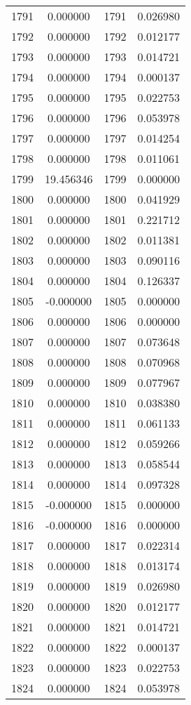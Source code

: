 \documentclass[12pt]{article}
\begin{document}
\begin{longtable}{@{}cccc@{}}
1791 & 0.000000 & 1791 & 0.026980 \\
1792 & 0.000000 & 1792 & 0.012177 \\
1793 & 0.000000 & 1793 & 0.014721 \\
1794 & 0.000000 & 1794 & 0.000137 \\
1795 & 0.000000 & 1795 & 0.022753 \\
1796 & 0.000000 & 1796 & 0.053978 \\
1797 & 0.000000 & 1797 & 0.014254 \\
1798 & 0.000000 & 1798 & 0.011061 \\
1799 & 19.456346 & 1799 & 0.000000 \\
1800 & 0.000000 & 1800 & 0.041929 \\
1801 & 0.000000 & 1801 & 0.221712 \\
1802 & 0.000000 & 1802 & 0.011381 \\
1803 & 0.000000 & 1803 & 0.090116 \\
1804 & 0.000000 & 1804 & 0.126337 \\
1805 & -0.000000 & 1805 & 0.000000 \\
1806 & 0.000000 & 1806 & 0.000000 \\
1807 & 0.000000 & 1807 & 0.073648 \\
1808 & 0.000000 & 1808 & 0.070968 \\
1809 & 0.000000 & 1809 & 0.077967 \\
1810 & 0.000000 & 1810 & 0.038380 \\
1811 & 0.000000 & 1811 & 0.061133 \\
1812 & 0.000000 & 1812 & 0.059266 \\
1813 & 0.000000 & 1813 & 0.058544 \\
1814 & 0.000000 & 1814 & 0.097328 \\
1815 & -0.000000 & 1815 & 0.000000 \\
1816 & -0.000000 & 1816 & 0.000000 \\
1817 & 0.000000 & 1817 & 0.022314 \\
1818 & 0.000000 & 1818 & 0.013174 \\
1819 & 0.000000 & 1819 & 0.026980 \\
1820 & 0.000000 & 1820 & 0.012177 \\
1821 & 0.000000 & 1821 & 0.014721 \\
1822 & 0.000000 & 1822 & 0.000137 \\
1823 & 0.000000 & 1823 & 0.022753 \\
1824 & 0.000000 & 1824 & 0.053978 \\

\end{longtable}
\end{document}

